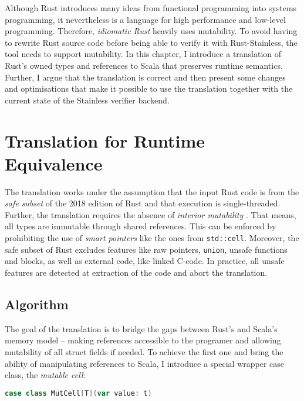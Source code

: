 Although Rust introduces many ideas from functional programming into systems
programming, it nevertheless is a language for high performance and low-level
programming. Therefore, \emph{idiomatic Rust} heavily uses mutability. To avoid
having to rewrite Rust source code before being able to verify it with
Rust-Stainless, the tool needs to support mutability. In this chapter, I
introduce a translation of Rust's owned types and references to Scala that
preserves runtime semantics. Further, I argue that the translation is correct
and then present some changes and optimisations that make it possible to use the
translation together with the current state of the Stainless verifier backend.

\section{Translation for Runtime Equivalence}
\label{sec:translation}

The translation works under the assumption that the input Rust code is from the
\emph{safe subset} \cite[section ``Unsafety'']{rustref} of the 2018 edition of
Rust and that execution is single-threaded. Further, the translation requires
the absence of \emph{interior mutability} \cite[section ``Interior
Mutability'']{rustref}. That means, all types are immutable through shared
references. This can be enforced by prohibiting the use of \emph{smart pointers}
like the ones from \passthrough{\lstinline!std::cell!}. Moreover, the safe
subset of Rust excludes features like raw pointers,
\passthrough{\lstinline!union!}, unsafe functions and blocks, as well as
external code, like linked C-code. In practice, all unsafe features are detected
at extraction of the code and abort the translation.


\subsection{Algorithm}

The goal of the translation is to bridge the gaps between Rust's and Scala's
memory model -- making references accessible to the programer and allowing
mutability of all struct fields if needed. To achieve the first one and bring
the ability of manipulating references to Scala, I introduce a special wrapper
case class, the \emph{mutable cell}:

\begin{lstlisting}[language=Scala, style=short]
case class MutCell[T](var value: t)
\end{lstlisting}

